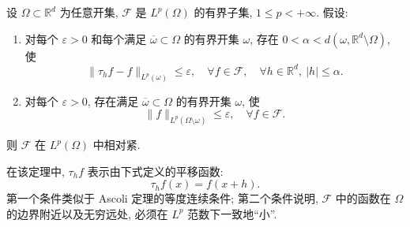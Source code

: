 \begin{Theorem}[Kolmogorov]
\label{thm:chap2-kolmogorov}
设 $\Omega\subset\mathbb{R}^d$ 为任意开集, $\mathcal{F}$ 是 $L^p(\Omega)$ 的有界子集, $1\leq p<+\infty$. 假设:
\begin{enumerate}
\item 对每个 $\varepsilon>0$ 和每个满足 $\overline\omega\subset\Omega$ 的有界开集 $\omega$, 存在 $0<\alpha<d(\omega,\mathbb{R}^d\setminus\Omega)$, 使
\begin{equation}
 \|\tau_hf-f\|_{L^p(\omega)}\leq\varepsilon,
 \quad\forall f\in\mathcal{F},\quad\forall h\in\mathbb{R}^d,\ |h|\leq\alpha.
 \label{eq:chap2-kolmogorov-translations}
\end{equation}
\item 对每个 $\varepsilon>0$, 存在满足 $\overline\omega\subset\Omega$ 的有界开集 $\omega$, 使
\begin{equation}
 \|f\|_{L^p(\Omega\setminus\omega)}\leq\varepsilon,
 \quad\forall f\in\mathcal{F}.
 \label{eq:chap2-kolmogorov-tightness}
\end{equation}
\end{enumerate}
则 $\mathcal{F}$ 在 $L^p(\Omega)$ 中相对紧.
\end{Theorem}

在该定理中, $\tau_hf$ 表示由下式定义的平移函数:
\[
 \tau_hf(x)=f(x+h).
\]
第一个条件类似于 Ascoli 定理的等度连续条件; 第二个条件说明, $\mathcal{F}$ 中的函数在 $\Omega$ 的边界附近以及无穷远处, 必须在 $L^p$ 范数下一致地“小”.

